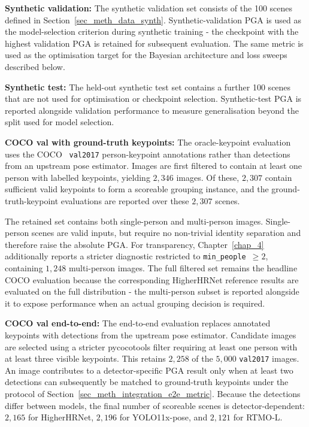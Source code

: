 \textbf{Synthetic validation:}
The synthetic validation set consists of the 100 scenes defined in
Section~\ref{sec_meth_data_synth}.
Synthetic-validation PGA is used as the model-selection criterion
during synthetic training -
the checkpoint with the highest validation PGA is retained
for subsequent evaluation.
The same metric is used as the optimisation target for the Bayesian
architecture and loss sweeps described below.

\textbf{Synthetic test:}
The held-out synthetic test set contains a further 100 scenes
that are not used for optimisation or checkpoint selection.
Synthetic-test PGA is reported alongside validation performance
to measure generalisation beyond the split used for model selection.

\textbf{COCO val with ground-truth keypoints:}
The oracle-keypoint evaluation uses the COCO~\cite{lin2014coco}
\texttt{val2017} person-keypoint annotations
rather than detections from an upstream pose estimator.
Images are first filtered to contain at least one person
with labelled keypoints,
yielding $2{,}346$ images.
Of these,
$2{,}307$ contain sufficient valid keypoints to form a scoreable
grouping instance,
and the ground-truth-keypoint evaluations are reported over these
$2{,}307$ scenes.

The retained set contains both single-person and multi-person images.
Single-person scenes are valid inputs,
but require no non-trivial identity separation
and therefore raise the absolute PGA.
For transparency,
Chapter~\ref{chap_4} additionally reports a stricter diagnostic
restricted to \texttt{min\_people}~$\geq2$,
containing $1{,}248$ multi-person images.
The full filtered set remains the headline COCO evaluation
because the corresponding HigherHRNet reference results
are evaluated on the full distribution -
the multi-person subset is reported alongside it to expose performance
when an actual grouping decision is required.

\textbf{COCO val end-to-end:}
The end-to-end evaluation replaces annotated keypoints
with detections from the upstream pose estimator.
Candidate images are selected using a stricter pycocotools filter
requiring at least one person with at least three visible keypoints.
This retains $2{,}258$ of the $5{,}000$ \texttt{val2017} images.
An image contributes to a detector-specific PGA result only when
at least two detections can subsequently be matched to ground-truth
keypoints under the protocol of
Section~\ref{sec_meth_integration_e2e_metric}.
Because the detections differ between models,
the final number of scoreable scenes is detector-dependent:
$2{,}165$ for HigherHRNet,
$2{,}196$ for YOLO11x-pose,
and $2{,}121$ for RTMO-L.

